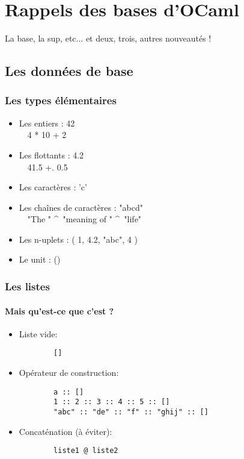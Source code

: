 \section{Rappels des bases d'OCaml}
\begin{frame}
  \begin{center}
	\huge
	La base, la sup, etc... et deux, trois, autres nouveautés !
  \end{center}
\end{frame}

\subsection{Les données de base} %
\begin{frame}[fragile]
	\frametitle{Les types élémentaires}
	\begin{itemize}
		\item Les entiers : 42\\
			~~4 * 10 + 2
		\item Les flottants : 4.2\\
			~~41.5 +. 0.5
		\item Les caractères : 'c'\\
		\item Les chaînes de caractères : "abcd"\\
			~~"The " \^~"meaning of " \^~"life"
			\item Les n-uplets : ( 1, 4.2, "abc", 4 )
		\item Le unit : ()
	\end{itemize}
\end{frame}

\begin{frame}[fragile]
	\frametitle{Les listes}
	\framesubtitle{Mais qu'est-ce que c'est ?}
	\begin{itemize}

	\item Liste vide:
		\begin{lstlisting}
		[]
		\end{lstlisting}

	\item Opérateur de construction:
		\begin{lstlisting}
		a :: []
		1 :: 2 :: 3 :: 4 :: 5 :: []
		"abc" :: "de" :: "f" :: "ghij" :: []
		\end{lstlisting}

	\item Concaténation (à éviter):
		\begin{lstlisting}
		liste1 @ liste2
		\end{lstlisting}

	\end{itemize}
\end{frame}

